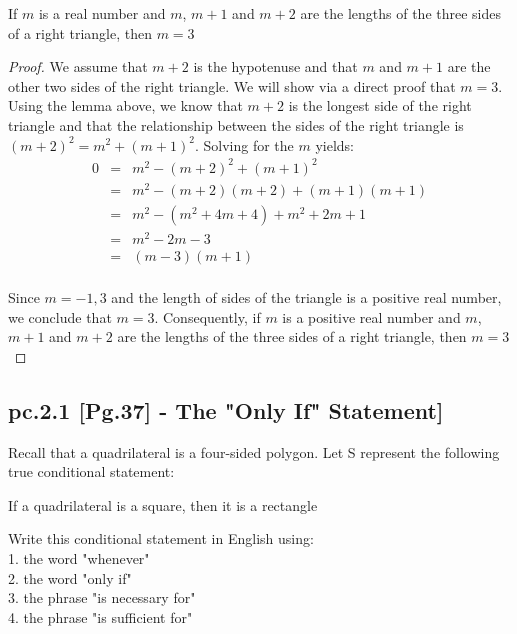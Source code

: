 \begin{tcolorbox}
	\begin{theorem}
		If $m$ is a real number and $m$, $m+1$ and $m+2$ are the lengths of the three sides of a right triangle, then $m=3$
	\end{theorem}
\end{tcolorbox}

\begin{proof}

We assume that $m+2$ is the hypotenuse and that $m$ and $m+1$ are the other two sides of the right triangle. We will show via a direct proof that $m=3$. \\

Using the lemma above, we know that $m+2$ is the longest side of the right triangle and that the relationship between the sides of the right triangle is $(m + 2)^2 = m^2 + (m + 1)^2$. Solving for the $m$ yields: \\

\begin{eqnarray}
	0 & = & m^2 - (m+2)^2 + (m+1)^2 \nonumber \\
	& = & m^2 - (m + 2)(m + 2) + (m + 1)(m + 1) \nonumber \\
	& = & m^2 - (m^2 + 4m + 4) + m^2 + 2m + 1 \nonumber \\
	& = & m^2 -2m - 3 \nonumber \\
	& = & (m-3)(m+1) \nonumber \\ 
\end{eqnarray}

Since $m = -1,3$ and the length of sides of the triangle is a positive real number, we conclude that $m=3$. Consequently, if $m$ is a positive real number and $m$, $m+1$ and $m+2$ are the lengths of the three sides of a right triangle, then $m=3$ 

\end{proof}



\newpage
\subsection{pc.2.1 [Pg.37] - The "Only If" Statement]}

Recall that a quadrilateral  is a four-sided polygon. Let S represent the following true conditional statement:
\begin{center}
If a quadrilateral is a square, then it is a rectangle
\end{center} 
Write this conditional statement in English using: \\
1. the word "whenever" \\
2. the word "only if" \\
3. the phrase "is necessary for" \\
4. the phrase "is sufficient for"  \\                              

